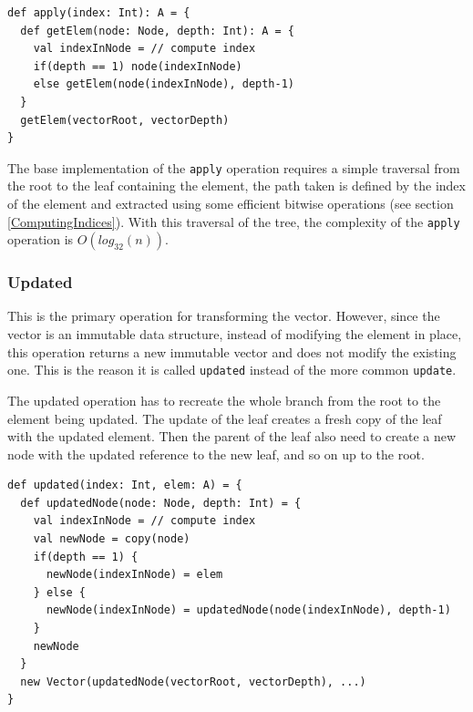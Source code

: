 \begin{lstlisting}[frame=single]
def apply(index: Int): A = {
  def getElem(node: Node, depth: Int): A = {
    val indexInNode = // compute index
    if(depth == 1) node(indexInNode)
    else getElem(node(indexInNode), depth-1) 
  }
  getElem(vectorRoot, vectorDepth)
}
\end{lstlisting}

The base implementation of the \texttt{apply} operation requires a simple traversal from the root to the leaf containing the element, the path taken is defined by the index of the element and extracted using some efficient bitwise operations (see section \ref{ComputingIndices}). With this traversal of the tree, the complexity of the \texttt{apply} operation is $O(log_{32}(n))$. 


\subsubsection{Updated}
\label{sec:updated}
This is the primary operation for transforming the vector. However, since the vector is an immutable data structure, instead of modifying the element in place, this operation returns a new immutable vector and does not modify the existing one. This is the reason it is called \texttt{updated} instead of the more common \texttt{update}.

The updated operation has to recreate the whole branch from the root to the element being updated. The update of the leaf creates a fresh copy of the leaf with the updated element. Then the parent of the leaf also need to create a new node with the updated reference to the new leaf, and so on up to the root. 

\begin{lstlisting}[frame=single]
def updated(index: Int, elem: A) = {
  def updatedNode(node: Node, depth: Int) = {
    val indexInNode = // compute index
    val newNode = copy(node)
    if(depth == 1) {
      newNode(indexInNode) = elem
    } else {
      newNode(indexInNode) = updatedNode(node(indexInNode), depth-1)
    }
    newNode
  }
  new Vector(updatedNode(vectorRoot, vectorDepth), ...)
}
\end{lstlisting}

